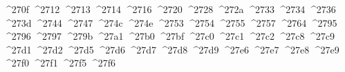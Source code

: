 {  ^^^^270f%
  ^^^^2712%
  ^^^^2713%
  ^^^^2714%
  ^^^^2716%
  ^^^^2720%
  ^^^^2728%
  ^^^^272a%
  ^^^^2733%
  ^^^^2734%
  ^^^^2736%
  ^^^^273d%
  ^^^^2744%
  ^^^^2747%
  ^^^^274c%
  ^^^^274e%
  ^^^^2753%
  ^^^^2754%
  ^^^^2755%
  ^^^^2757%
  ^^^^2764%
  ^^^^2795%
  ^^^^2796%
  ^^^^2797%
  ^^^^279b%
  ^^^^27a1%
  ^^^^27b0%
  ^^^^27bf%
  ^^^^27c0%
  ^^^^27c1%
  ^^^^27c2%
  ^^^^27c8%
  ^^^^27c9%
  ^^^^27d1%
  ^^^^27d2%
  ^^^^27d5%
  ^^^^27d6%
  ^^^^27d7%
  ^^^^27d8%
  ^^^^27d9%
  ^^^^27e6%
  ^^^^27e7%
  ^^^^27e8%
  ^^^^27e9%
  ^^^^27f0%
  ^^^^27f1%
  ^^^^27f5%
  ^^^^27f6%
}
